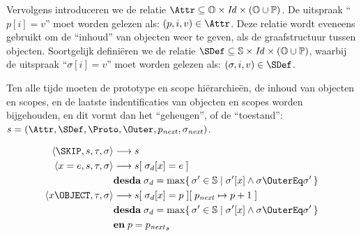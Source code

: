 Vervolgens introduceren we de relatie $\Attr \subseteq \mathbb{O} \times \mathit{Id} \times (\mathbb{O} \cup \mathbb{P})$. De uitspraak “$p[i] = v$” moet worden gelezen als: $(p, i, v) \in \Attr$. Deze relatie wordt eveneens gebruikt om de “inhoud” van objecten weer te geven, als de graafstructuur tussen objecten. Soortgelijk definiëren we de relatie $\SDef \subseteq \mathbb{S} \times \mathit{Id} \times (\mathbb{O} \cup \mathbb{P})$, waarbij de uitspraak “$\sigma[i] = v$” moet worden gelezen als: $(\sigma, i, v) \in \SDef$.

Ten alle tijde moeten de prototype en scope hiërarchieën, de inhoud van objecten en scopes, en de laatste indentificaties van objecten en scopes worden bijgehouden, en dit vormt dan het “geheugen”, of de “toestand”: $s = (\Attr, \SDef, \Proto, \Outer, p_\mathit{next}, \sigma_\mathit{next})$.

\begin{align*}
	\left<\SKIP, s, \tau, \sigma\right> &\longrightarrow s \\
	\left<x = e, s, \tau, \sigma\right> &\longrightarrow s[\; \sigma_d[x] = e \;] \\
	& \textbf{desda}\; \sigma_d = \max \{\, \sigma' \in \mathbb{S} \mid \sigma'[x] \land \sigma \OuterEq \sigma' \,\} \\
	\left<x \OBJECT, \tau, \sigma\right> &\longrightarrow s[\; \sigma_d[x] = p \;][\; p_\mathit{next} \mapsto p + 1 \;] \\
	& \textbf{desda}\; \sigma_d = \max \{\, \sigma' \in \mathbb{S} \mid \sigma'[x] \land \sigma \OuterEq \sigma' \,\} \\
	& \textbf{en}\; p = {p_\mathit{next}}_s
\end{align*}
